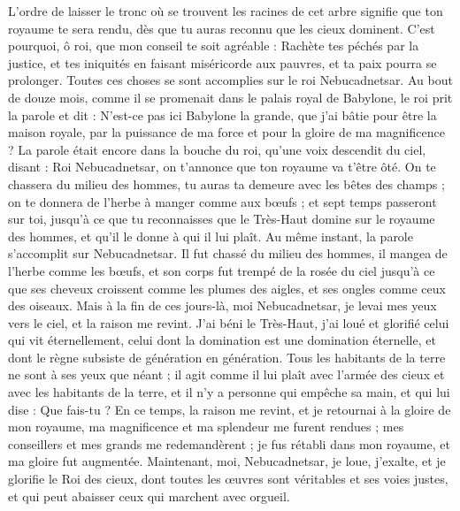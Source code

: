 \begin{multicols}{2}
L’ordre de laisser le tronc où se trouvent les racines de cet arbre signifie que ton royaume te sera rendu, dès que tu auras reconnu que les cieux dominent.
C'est pourquoi, ô roi, que mon conseil te soit agréable : Rachète tes péchés par la justice, et tes iniquités en faisant miséricorde aux pauvres, et ta paix pourra se prolonger.
Toutes ces choses se sont accomplies sur le roi Nebucadnetsar.
Au bout de douze mois, comme il se promenait dans le palais royal de Babylone,
le roi prit la parole et dit : N'est-ce pas ici Babylone la grande, que j'ai bâtie pour être la maison royale, par la puissance de ma force et pour la gloire de ma magnificence ?
La parole était encore dans la bouche du roi, qu’une voix descendit du ciel, disant : Roi Nebucadnetsar, on t'annonce que ton royaume va t’être ôté.
On te chassera du milieu des hommes, tu auras ta demeure avec les bêtes des champs ; on te donnera de l'herbe à manger comme aux bœufs ; et sept temps passeront sur toi, jusqu’à ce que tu reconnaisses que le Très-Haut domine sur le royaume des hommes, et qu'il le donne à qui il lui plaît.
Au même instant, la parole s’accomplit sur Nebucadnetsar. Il fut chassé du milieu des hommes, il mangea de l'herbe comme les bœufs, et son corps fut trempé de la rosée du ciel jusqu'à ce que ses cheveux croissent comme les plumes des aigles, et ses ongles comme ceux des oiseaux.
Mais à la fin de ces jours-là, moi Nebucadnetsar, je levai mes yeux vers le ciel, et la raison me revint. J’ai béni le Très-Haut, j’ai loué et glorifié celui qui vit éternellement, celui dont la domination est une domination éternelle, et dont le règne subsiste de génération en génération.
Tous les habitants de la terre ne sont à ses yeux que néant ; il agit comme il lui plaît avec l'armée des cieux et avec les habitants de la terre, et il n'y a personne qui empêche sa main, et qui lui dise : Que fais-tu ?
En ce temps, la raison me revint, et je retournai à la gloire de mon royaume, ma magnificence et ma splendeur me furent rendues ; mes conseillers et mes grands me redemandèrent ; je fus rétabli dans mon royaume, et ma gloire fut augmentée.
Maintenant, moi, Nebucadnetsar, je loue, j'exalte, et je glorifie le Roi des cieux, dont toutes les œuvres sont véritables et ses voies justes, et qui peut abaisser ceux qui marchent avec orgueil.

\end{multicols}

